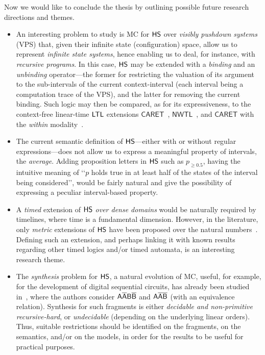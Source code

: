 Now we would like to conclude the thesis by outlining possible future research directions and themes.
\begin{itemize}
    \item An interesting problem to study is MC for $\text{\sffamily HS}$ over \emph{visibly pushdown systems} (VPS) that,
    given their infinite state (configuration) space, allow us to represent \emph{infinite state systems}, hence enabling us to deal, for instance, with \emph{recursive programs}.
    In this case, $\text{\sffamily HS}$ may be extended with a \emph{binding} and an \emph{unbinding} operator---the former for restricting the valuation of its argument to the sub-intervals of the current context-interval (each interval being a computation trace of the VPS), and the latter for removing the current binding. Such logic may then be compared, as for its expressiveness, to the context-free linear-time $\text{\sffamily LTL}$ extensions  $\mathsf{CARET}$~\cite{AlurEM04}, $\mathsf{NWTL}$~\cite{AlurABEIL07}, and $\mathsf{CARET}$ with the \emph{within} modality~\cite{AlurABEIL07}.
    \item The current semantic definition of $\text{\sffamily HS}$---either with or without regular expressions---does not allow us to express a meaningful property of intervals, the \emph{average}.
    Adding proposition letters in $\text{\sffamily HS}$ such as $p_{\geq 0.5}$, having the intuitive meaning of \lq\lq $p$ holds true in at least half of the states of the interval being considered\rq\rq , would be fairly natural and give the possibility of expressing a peculiar interval-based property.
    \item A \emph{timed} extension of $\text{\sffamily HS}$ \emph{over dense domains} would be naturally required by timelines, where time is a fundamental dimension. However, in the literature, only \emph{metric} extensions of $\text{\sffamily HS}$ have been proposed over the natural numbers~\cite{DBLP:journals/sosym/BresolinMGMS13}. Defining such an extension, and perhaps 
    linking it with known results regarding other timed logics and/or timed automata, is an interesting research theme.
    \item The \emph{synthesis} problem for $\text{\sffamily HS}$, a natural evolution of MC, useful, for example, for the development of digital sequential circuits, has already been studied in~\cite{DBLP:journals/corr/MontanariS14}, where the authors consider $\mathsf{A\overline{A}B\overline{B}}$ and $\mathsf{A\overline{A}}\mathsf{\overline{B}}$ (with an equivalence relation). Synthesis for such fragments is either \emph{decidable and non-primitive recursive-hard}, or \emph{undecidable} (depending on the underlying linear orders).
    Thus, suitable restrictions should be identified on the fragments, on the semantics, and/or on the models, in order for the results to be useful for practical purposes.
\end{itemize}